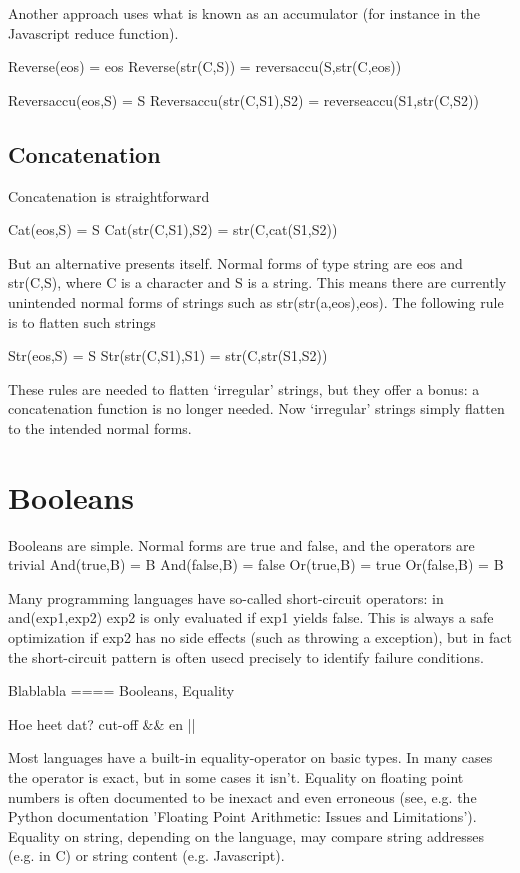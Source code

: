 \documentclass[11pt,twoside]{memoir}
\begin{document}
Another approach uses what is known as an accumulator (for instance in the Javascript reduce function).

Reverse(eos) = eos
Reverse(str(C,S)) = reversaccu(S,str(C,eos))

Reversaccu(eos,S) = S
Reversaccu(str(C,S1),S2) = reverseaccu(S1,str(C,S2))

\subsection{Concatenation}
Concatenation is straightforward

Cat(eos,S) = S
Cat(str(C,S1),S2) = str(C,cat(S1,S2))

But an alternative presents itself. Normal forms of type string are eos and str(C,S), where C is a character and S is a string. This means there are currently unintended normal forms of strings such as str(str(a,eos),eos). The following rule is to flatten such strings

Str(eos,S) = S
Str(str(C,S1),S1) = str(C,str(S1,S2))

These rules are needed to flatten `irregular' strings, but they offer a bonus: a concatenation function is no longer needed. Now `irregular' strings simply flatten to the intended normal forms.


\section{Booleans}
Booleans are simple. Normal forms are true and false, and the operators are trivial
And(true,B) = B
And(false,B) = false
Or(true,B) = true
Or(false,B) = B

Many programming languages have so-called short-circuit operators: in and(exp1,exp2) exp2 is only evaluated if exp1 yields false. This is always a safe optimization if exp2 has no side effects (such as throwing a exception), but in fact the short-circuit pattern is often usecd precisely to identify failure conditions.

Blablabla
==== Booleans, Equality

Hoe heet dat? cut-off \&\& en ||

Most languages have a built-in equality-operator on basic types. In many cases the operator is exact, but in some cases it isn't. Equality on floating point numbers is often documented to be inexact and even erroneous (see, e.g. the Python documentation 'Floating Point Arithmetic: Issues and Limitations'). Equality on string, depending on the language, may compare string addresses (e.g. in C) or string content (e.g. Javascript).
\end{document}

